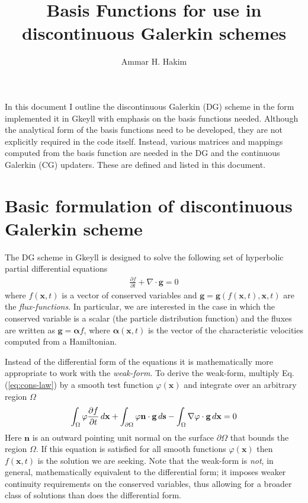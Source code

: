 \documentclass[11pt, reqno]{amsart}
\title[Basis Functions]{Basis Functions for use in discontinuous Galerkin schemes}
\author{Ammar H. Hakim}%
\date{}%
\newcommand{\eqr}[1]{Eq.\thinspace(#1)}
\newcommand{\pfrac}[2]{\frac{\partial #1}{\partial #2}}
\newcommand{\mvec}[1]{\mathbf{#1}}
\newcommand{\gvec}[1]{\boldsymbol{#1}}
\theoremstyle{definition}
\begin{document}
%
\maketitle

In this document I outline the discontinuous Galerkin (DG) scheme in
the form implemented it in Gkeyll with emphasis on the basis functions
needed. Although the analytical form of the basis functions need to be
developed, they are not explicitly required in the code
itself. Instead, various matrices and mappings computed from the basis
function are needed in the DG and the continuous Galerkin (CG)
updaters. These are defined and listed in this document.

\section{Basic formulation of discontinuous Galerkin scheme}

The DG scheme in Gkeyll is designed to solve the following set of
hyperbolic partial differential equations
\begin{align}
  \pfrac{f}{t} + \nabla\cdot\mvec{g} = 0 \label{eq:cons-law}
\end{align}
where $f(\mvec{x},t)$ is a vector of conserved variables and $\mvec{g}
= \mvec{g}(f(\mvec{x},t),\mvec{x},t)$ are the
\emph{flux-functions}. In particular, we are interested in the case in
which the conserved variable is a scalar (the particle distribution
function) and the fluxes are written as $\mvec{g} = \gvec{\alpha}f$,
where $\gvec{\alpha}(\mvec{x},t)$ is the vector of the characteristic
velocities computed from a Hamiltonian.

Instead of the differential form of the equations it is mathematically
more appropriate to work with the \emph{weak-form}. To derive the
weak-form, multiply \eqr{\ref{eq:cons-law}} by a smooth test function
$\varphi(\mvec{x})$ and integrate over an arbitrary region $\Omega$
\begin{align}
  \int_\Omega \varphi \pfrac{f}{t}\thinspace d\mvec{x} 
  + \int_{\partial \Omega}\varphi \mvec{n}\cdot\mvec{g}\thinspace d\mvec{s} 
  - \int_\Omega \nabla\varphi\cdot\mvec{g}\thinspace d\mvec{x}
  = 0
\end{align}
Here $\mvec{n}$ is an outward pointing unit normal on the surface
$\partial\Omega$ that bounds the region $\Omega$. If this equation is
satisfied for all smooth functions $\varphi(\mvec{x})$ then
$f(\mvec{x},t)$ is the solution we are seeking. Note that the
weak-form is \emph{not}, in general, mathematically equivalent to the
differential form; it imposes weaker continuity requirements on the
conserved variables, thus allowing for a broader class of solutions
than does the differential form.
\end{document}
